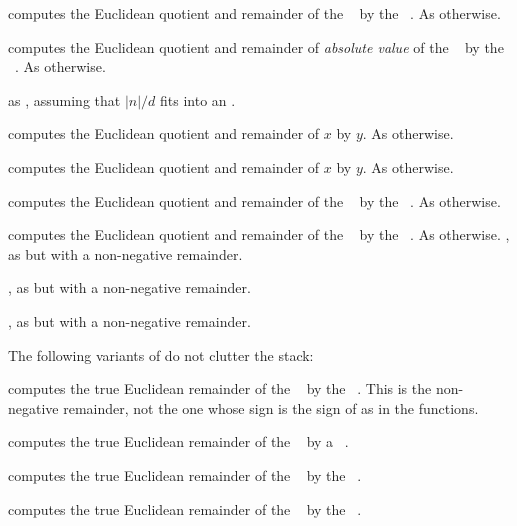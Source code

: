  computes the Euclidean quotient
and remainder of the ~ by the ~. As
 otherwise.

 computes the Euclidean quotient
and remainder of \emph{absolute value} of the ~ by the
~. As  otherwise.

 as , assuming
that $|n|/d$ fits into an .

computes the Euclidean quotient and remainder of $x$ by $y$. As
 otherwise.

computes the Euclidean quotient and remainder of $x$ by $y$. As
 otherwise.

 computes the Euclidean quotient
and remainder of the ~ by the ~. As
 otherwise.

 computes the Euclidean quotient
and remainder of the ~ by the ~. As
 otherwise.
\smallskip
{}, as  but with a
non-negative remainder.

, as  but with a
non-negative remainder.

, as  but with a
non-negative remainder.

 The following variants of  do not
clutter the stack:

 computes the true Euclidean
remainder of the ~ by the ~. This is the
non-negative remainder, not the one whose sign is the sign of 
as in the  functions.

 computes the true Euclidean
remainder of the ~ by a ~.

 computes the true Euclidean
remainder of the ~ by the ~.

 computes the true Euclidean
remainder of the ~ by the ~.

